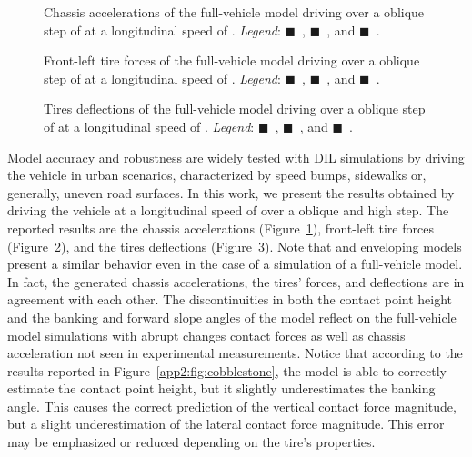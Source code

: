 \begin{figure}[htb]
  \centering
  \small{}
  \caption{Chassis accelerations of the full-vehicle model driving over a  oblique step of  at a longitudinal speed of . \emph{Legend}:
  {\color{mycolor1}$\blacksquare$}~\Enve{}, {\color{mycolor2}$\blacksquare$}~\Swift{}, and {\color{mycolor3}$\blacksquare$}~\TMEasy{}.}
  \label{app2:fig:accelerations}
\end{figure}

\begin{figure}[htb]
  \centering
  \small{}
  \caption{Front-left tire forces of the full-vehicle model driving over a  oblique step of  at a longitudinal speed of . \emph{Legend}: {\color{mycolor1}$\blacksquare$}~\Enve{}, {\color{mycolor2}$\blacksquare$}~\Swift{}, and {\color{mycolor3}$\blacksquare$}~\TMEasy{}.}
  \label{app2:fig:forces}
\end{figure}

\begin{figure}[htb]
  \centering
  \small{}
  \caption{Tires deflections of the full-vehicle model driving over a  oblique step of  at a longitudinal speed of . \emph{Legend}: {\color{mycolor1}$\blacksquare$}~\Enve{}, {\color{mycolor2}$\blacksquare$}~\Swift{}, and {\color{mycolor3}$\blacksquare$}~\TMEasy{}.}
  \label{app2:fig:rho}
\end{figure}

Model accuracy and robustness are widely tested with DIL simulations by driving the vehicle in urban scenarios, characterized by speed bumps, sidewalks or, generally, uneven road surfaces. In this work, we present the results obtained by driving the vehicle at a longitudinal speed of  over a  oblique and  high step. The reported results are the chassis accelerations (Figure~\ref{app2:fig:accelerations}), front-left tire forces (Figure~\ref{app2:fig:forces}), and the tires deflections (Figure~\ref{app2:fig:rho}). Note that \Enve{} and \Swift{} enveloping models present a similar behavior even in the case of a simulation of a full-vehicle model. In fact, the generated chassis accelerations, the tires' forces, and deflections are in agreement with each other. The discontinuities in both the contact point height and the banking and forward slope angles of the \TMEasy{} model reflect on the full-vehicle model simulations with abrupt changes contact forces as well as chassis acceleration not seen in experimental measurements. Notice that according to the results reported in Figure~\ref{app2:fig:cobblestone}, the \Enve{} model is able to correctly estimate the contact point height, but it slightly underestimates the banking angle. This causes the correct prediction of the vertical contact force magnitude, but a slight underestimation of the lateral contact force magnitude. This error may be emphasized or reduced depending on the tire's properties.

